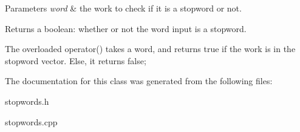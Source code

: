 \begin{DoxyParams}{Parameters}
{\em word} & the work to check if it is a stopword or not. \\
\hline
\end{DoxyParams}
\begin{DoxyReturn}{Returns}
a boolean\+: whether or not the word input is a stopword.
\end{DoxyReturn}
The overloaded operator() takes a word, and returns true if the work is in the stopword vector. Else, it returns false; 

The documentation for this class was generated from the following files\+:\begin{DoxyCompactItemize}
\item 
stopwords.\+h\item 
stopwords.\+cpp\end{DoxyCompactItemize}
